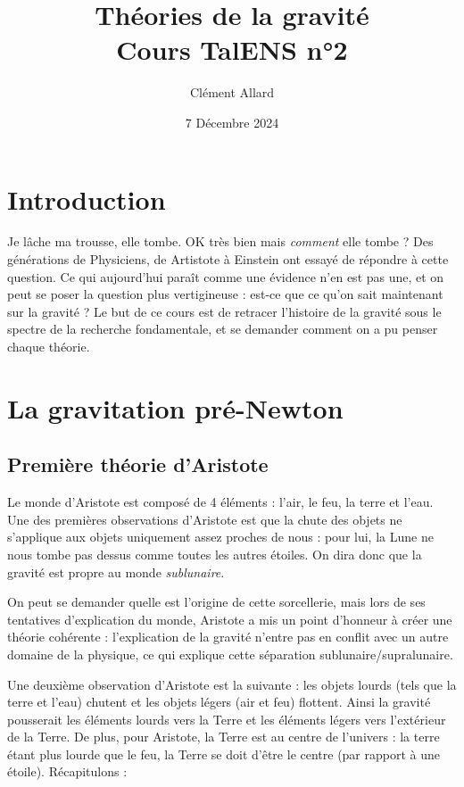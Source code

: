 \documentclass{classe}
\title{Théories de la gravité\\ \small Cours TalENS n°2}
\author{Clément Allard}
\date{7 Décembre 2024}
\begin{document}
\section*{Introduction}

Je lâche ma trousse, elle tombe. OK très bien mais \textit{comment} elle tombe ? Des générations de Physiciens, de Artistote à Einstein ont essayé de répondre à cette question. Ce qui aujourd'hui paraît comme une évidence n'en est pas une, et on peut se poser la question plus vertigineuse : est-ce que ce qu'on sait maintenant sur la gravité ? Le but de ce cours est de retracer l'histoire de la gravité sous le spectre de la recherche fondamentale, et se demander comment on a pu penser chaque théorie.

\section{La gravitation pré-Newton}

\subsection{Première théorie d'Aristote}

Le monde d'Aristote est composé de 4 éléments : l'air, le feu, la terre et l'eau. Une des premières observations d'Aristote est que la chute des objets ne s'applique aux objets uniquement assez proches de nous : pour lui, la Lune ne nous tombe pas dessus comme toutes les autres étoiles. On dira donc que la gravité est propre au monde \textit{sublunaire}.

\begin{remarque}{}{}
On peut se demander quelle est l'origine de cette sorcellerie, mais lors de ses tentatives d'explication du monde, Aristote a mis un point d'honneur à créer une théorie cohérente : l'explication de la gravité n'entre pas en conflit avec un autre domaine de la physique, ce qui explique cette séparation sublunaire/supralunaire.
\end{remarque}{}

Une deuxième observation d'Aristote est la suivante : les objets lourds (tels que la terre et l'eau) chutent et les objets légers (air et feu) flottent. Ainsi la gravité pousserait les éléments lourds vers la Terre et les éléments légers vers l'extérieur de la Terre. De plus, pour Aristote, la Terre est au centre de l'univers : la terre étant plus lourde que le feu, la Terre se doit d'être le centre (par rapport à une étoile). 
Récapitulons :
\end{document}
